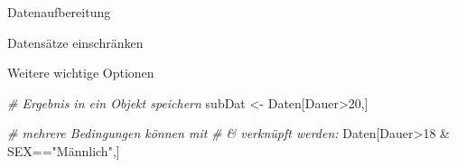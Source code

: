 \documentclass[ignorenonframetext,]{beamer}
\newenvironment{Shaded}{}{}
\newcommand{\DecValTok}[1]{\textcolor[rgb]{0.25,0.63,0.44}{{#1}}}
\newcommand{\StringTok}[1]{\textcolor[rgb]{0.25,0.44,0.63}{{#1}}}
\newcommand{\CommentTok}[1]{\textcolor[rgb]{0.38,0.63,0.69}{\textit{{#1}}}}
\newcommand{\NormalTok}[1]{{#1}}
\begin{document}
\begin{frame}[fragile]{Datenaufbereitung}
\begin{block}{Datensätze einschränken}
\end{block}

\begin{block}{Weitere wichtige Optionen}

\begin{Shaded}
\begin{Highlighting}[]
\CommentTok{# Ergebnis in ein Objekt speichern}
\NormalTok{subDat <-}\StringTok{ }\NormalTok{Daten[Dauer>}\DecValTok{20}\NormalTok{,]}
\end{Highlighting}
\end{Shaded}

\begin{Shaded}
\begin{Highlighting}[]
\CommentTok{# mehrere Bedingungen können mit}
\CommentTok{# & verknüpft werden:}
\NormalTok{Daten[Dauer>}\DecValTok{18} \NormalTok{&}\StringTok{ }\NormalTok{SEX==}\StringTok{"Männlich"}\NormalTok{,]}
\end{Highlighting}
\end{Shaded}


\end{block}
\end{frame}
\end{document}
